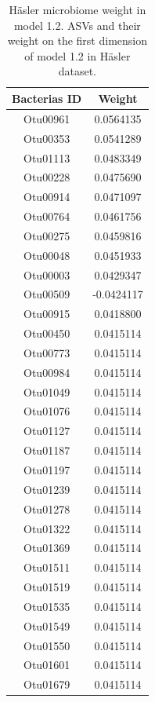 \documentclass[
  12pt,
  a4paper,
  twoside,
  openright]{book}
\begin{document}
\begin{longtable}[t]{cc}
\caption[Häsler microbiome weight in model 1.2]{\label{tab:hasler-microbiome-1-2}Häsler microbiome weight in model 1.2. ASVs and their weight on the first dimension of model 1.2 in Häsler dataset.}\\
\toprule
Bacterias ID & Weight\\
\midrule
Otu00961 & 0.0564135\\
Otu00353 & 0.0541289\\
Otu01113 & 0.0483349\\
Otu00228 & 0.0475690\\
Otu00914 & 0.0471097\\
\addlinespace
Otu00764 & 0.0461756\\
Otu00275 & 0.0459816\\
Otu00048 & 0.0451933\\
Otu00003 & 0.0429347\\
Otu00509 & -0.0424117\\
\addlinespace
Otu00915 & 0.0418800\\
Otu00450 & 0.0415114\\
Otu00773 & 0.0415114\\
Otu00984 & 0.0415114\\
Otu01049 & 0.0415114\\
\addlinespace
Otu01076 & 0.0415114\\
Otu01127 & 0.0415114\\
Otu01187 & 0.0415114\\
Otu01197 & 0.0415114\\
Otu01239 & 0.0415114\\
\addlinespace
Otu01278 & 0.0415114\\
Otu01322 & 0.0415114\\
Otu01369 & 0.0415114\\
Otu01511 & 0.0415114\\
Otu01519 & 0.0415114\\
\addlinespace
Otu01535 & 0.0415114\\
Otu01549 & 0.0415114\\
Otu01550 & 0.0415114\\
Otu01601 & 0.0415114\\
Otu01679 & 0.0415114\\
\bottomrule
\end{longtable}
\end{document}
